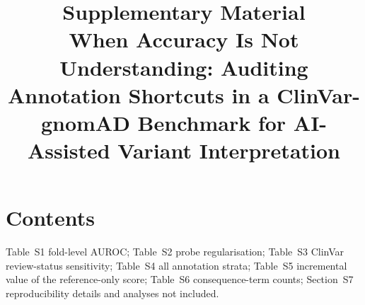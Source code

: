 \documentclass[11pt]{article}
\title{\textbf{Supplementary Material}\\[4pt]\large When Accuracy Is Not Understanding: Auditing Annotation Shortcuts in a ClinVar-gnomAD Benchmark for AI-Assisted Variant Interpretation}
\date{}
\begin{document}
\maketitle

\section*{Contents}
Table~S1 fold-level AUROC; Table~S2 probe regularisation; Table~S3 ClinVar review-status sensitivity; Table~S4 all annotation strata; Table~S5 incremental value of the reference-only score; Table~S6 consequence-term counts; Section~S7 reproducibility details and analyses not included.

\begin{table}[h]
\centering\small

\caption{AUROC within each held-out chromosome group (pooled out-of-fold predictions split by group). Groups follow the definitions of Feng et al.\ (2025): group 1 = chr3, 6, 9, 12, 16, 18, 19, 21; group 2 = chr2, 5, 11, 14, 17, 20, 22, X; group 3 = chr1, 4, 7, 8, 10, 13, 15.}
\end{table}

\begin{table}[h]
\centering\small

\caption{AUROC across L2 regularisation strengths $C$ (inverse regularisation; larger is weaker). The main text uses $C=1$, fixed in advance and identical for all feature sources. Annotation-only results (\CAnnMin-\CAnnMax) and variant-specific results (\CDeltaMin-\CDeltaMax) were stable across strengths, whereas reference-only AUROC varied; none of the conclusions depends on this choice.}
\end{table}

\begin{table}[h]
\centering\small
\resizebox{\linewidth}{!}{}
\caption{AUROC after restricting the pathogenic class by ClinVar review status (all common variants retained). The first subset is the full sample. Annotation-only AUROC is essentially unchanged, so the findings are not driven by the weakest assertions.}
\end{table}

\begin{table}[h]
\centering\footnotesize
\resizebox{\linewidth}{!}{}
\caption{All annotation strata. ``Annotation'' within the non-coding-transcript stratum reaches AUROC 1.000 because the two classes spell the non-coding term differently; this is a vocabulary artefact, not a biological signal. Strata are defined from the consequence string: plain missense; any non-coding-transcript term; other.}
\end{table}
\end{document}
